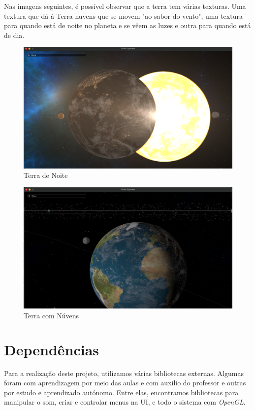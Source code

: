 \noindent
Nas imagens seguintes, é possível observar que a terra tem várias texturas. Uma textura que dá à Terra nuvens que se movem "ao sabor do vento", uma textura para quando está de noite no planeta e se vêem as luzes e outra para quando está de dia.

\begin{figure}[h]
\includegraphics[width=400pt]{earth_planet.png}
\caption{Terra de Noite}
\end{figure}

\enlargethispage{4in}
\begin{figure}[H]
\includegraphics[width=400pt]{earth_clouds.png}
\caption{Terra com Núvens}
\end{figure}

\newpage
\section{Dependências}
\label{chap2:sec:dep}

\noindent
Para a realização deste projeto, utilizamos várias bibliotecas externas. Algumas foram com aprendizagem por meio das aulas e com auxílio do professor e outras por estudo e aprendizado autónomo. Entre elas, encontramos bibliotecas para manipular o som, criar e controlar menus na \ac{UI}, e todo o sistema com \textit{OpenGL}.

